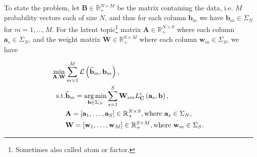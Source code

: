 To state the problem,
let $\mathbf{B} \in \mathbb{R}_+^{N\times M}$ be the matrix containing the data,
i.e. $M$ probability vectors each of size $N$,
and thus for each column $\mathbf{b}_m$ we have $\mathbf{b}_m \in \Sigma_N$
for $m = 1, \ldots, M$.
For the latent topic\footnote{
  Sometimes also called atom or factor.
} matrix $\mathbf{A} \in \mathbb{R}_+^{N \times S}$ where each column $\mathbf{a}_s \in \Sigma_N$,
and the weight matrix $\mathbf{W} \in \mathbb{R}_+^{S \times M}$ where each column $\mathbf{w}_m \in \Sigma_S$,
we have

\begin{equation}\label{eqn:wasserstein-dictionary-problem-constrained}
  \begin{aligned}
    \min_{\mathbf{A}, \mathbf{W}}
     &
    \sum_{m = 1}^M \mathcal{L} \left(\widehat{\mathbf{b}}_m, \mathbf{b}_m\right),                    \\
    \text{s.t.}
     & \widehat{\mathbf{b}}_m =
    \operatorname*{arg\,min}_{\mathbf{b} \in \Sigma_N}
    \sum_{s = 1}^S \mathbf{W}_{sm} L_{\mathbf{C}}^\varepsilon \left(\mathbf{a}_s, \mathbf{b}\right), \\
     & \mathbf{A} = \left[\mathbf{a}_1, \ldots, \mathbf{a}_S\right] \in \mathbb{R}_+^{N \times S},
    \text{where } \mathbf{a}_s \in \Sigma_N,                                                         \\
     & \mathbf{W} = \left[\mathbf{w}_1, \ldots, \mathbf{w}_M\right] \in \mathbb{R}_+^{S \times M},
    \text{where } \mathbf{w}_m \in \Sigma_S.
  \end{aligned}
\end{equation}





